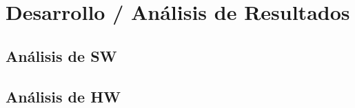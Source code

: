 \section{Desarrollo / Análisis de Resultados}
\subsection{Análisis de SW}
\subsection{Análisis de HW}